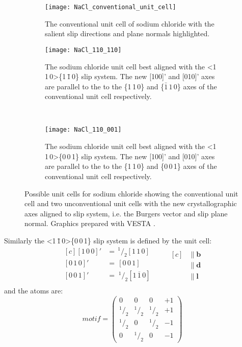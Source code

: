 \begin{figure}
\centering


    \begin{subfigure}{0.55\textwidth}
    \centering
    \texttt{[image: NaCl\_conventional\_unit\_cell]}
    \caption{The conventional unit cell of sodium chloride with the salient slip directions and plane normals highlighted. \label{fig:NaCl_conventional_cell_slip_system_marked}}
    \end{subfigure}

    \begin{subfigure}{0.4\textwidth}
    \centering
    \texttt{[image: NaCl\_110\_110]}
    \caption{The sodium chloride unit cell best aligned with the <1\,1\,0>\{1\,\={1}\,0\} slip system. The new [100]' and [010]' axes are parallel to the to the \{1\,1\,0\} and \{$\bar{1}\,1\,0$\} axes of the conventional unit cell respectively.  \label{fig:NaCl_110_110_unit_cell}}
    \end{subfigure}
    ~
    \begin{subfigure}{0.4\textwidth}
    \centering
    \texttt{[image: NaCl\_110\_001]}
    \caption{The sodium chloride unit cell best aligned with the <1\,1\,0>\{0\,0\,1\} slip system.  The new [100]' and [010]' axes are parallel to the to the \{1\,1\,0\} and \{0\,0\,1\} axes of the conventional unit cell respectively.\label{fig:NaCl_110_001_unit_cell}}
    \end{subfigure}

\caption[Unconventional unit cells of rock salt to build a dislocation.]{Possible unit cells for sodium chloride showing the conventional unit cell and two unconventional unit cells with the new crystallographic axes aligned to slip system, i.e. the Burgers vector and slip plane normal. Graphics prepared with VESTA \cite{Momma2011}.\label{fig:unconventional_NaCl_unit_cells}}
\end{figure}






Similarly the  <1\,\={1}\,0>\{0\,0\,1\} slip system is defined by the unit cell:
\begin{equation*}
\begin{aligned}[c]
 {[1\,0\,0]}' &=\, ^{1}\!/_{2} [1\,1\,0] \\
 {[0\,1\,0]}' &=\,  [0\,0\,1] \\
 {[0\,0\,1]}' &=\; ^{1}\!/_{2} [1\,\overline{1}\,0] \\
\end{aligned}
\qquad
\begin{aligned}[c]
&\parallel \mathbf{b} \\
&\parallel \mathbf{d} \\
&\parallel \mathbf{l}
\end{aligned}
\end{equation*}
and the atoms are:
$$
motif = \begin{pmatrix}
0 & 0 & 0 & +1 \\
^{1}\!/_{2} & ^{1}\!/_{2} & ^{1}\!/_{2} & +1 \\
^{1}\!/_{2} & 0 & ^{1}\!/_{2} & -1 \\
0 & ^{1}\!/_{2} & 0 & -1
\end{pmatrix}
$$


